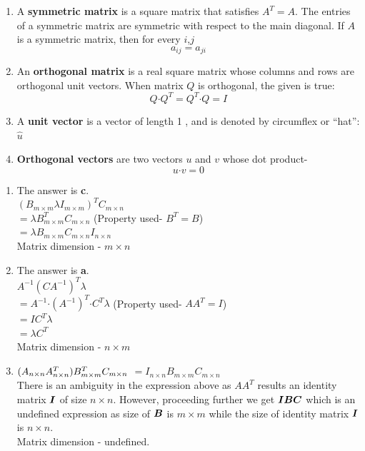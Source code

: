 \begin{exercise}
\end{exercise}

\begin{solution}
   \color{blue}
   \begin{enumerate}
       \item A \textbf{symmetric matrix} is a square matrix that satisfies $ A^T = A$. The entries of a symmetric matrix are symmetric with respect to the main diagonal. If $A$ is a symmetric matrix, then for every $i$,$j$ $$ a_{ij} = a_{ji}$$

        \item An \textbf{orthogonal matrix} is a real square matrix whose columns and rows are orthogonal unit vectors. When matrix $Q$ is orthogonal, the given is true:
        $$
        Q\mathord{\cdot}Q^T = Q^T\mathord{\cdot}Q = I
        $$

        \item A \textbf{unit vector} is a vector of length 1 , and is denoted by circumflex or “hat”: $\hat{u}$ 
        \item \textbf{Orthogonal vectors} are two vectors $u$ and $v$ whose dot product- $$u\mathord{\cdot}v = 0$$
   \end{enumerate}

   \begin{enumerate}
       \item The answer is \textbf{c}.\\
        $ (B_{m \times m}\lambda I_{m \times m})^{T}C_{m \times n}$\\
        $= \lambda B_{m \times m}^{T}C_{m \times n}$ (Property used- $B^T=B$)\\
        $= \lambda B_{m \times m}C_{m \times n}I_{n \times n} $\\
        Matrix dimension - $m \times n$

        \item The answer is \textbf{a}.\\
        $ A^{-1}(CA^{-1})^{T}\lambda$\\
        $= A^{-1}\mathord{\cdot}(A^{-1})^{T}\mathord{\cdot}C^{T}\lambda$  (Property used- $AA^T=I$)\\
        $= IC^{T}\lambda$ \\
        $= \lambda C^{T}$ \\
        Matrix dimension - $n \times m$

        \item
        $ (A_{n \times n}A^{T}_{n \times n})B^{T}_{m \times m}C_{m \times n}\\$
        $= I_{n \times n}B_{m \times m}C_{m \times n}$\\
        There is an ambiguity in the expression above as $ AA^{T}$ results an identity matrix $\boldsymbol{I}$ of size $n \times n$. However, proceeding further we get $\boldsymbol{I}\boldsymbol{B}\boldsymbol{C}$ which is an undefined expression as size of $\boldsymbol{B}$ is $m \times m$ while the size of identity matrix $\boldsymbol{I}$ is $n \times n$.  \\
        Matrix dimension - undefined.
   \end{enumerate}

\end{solution}

